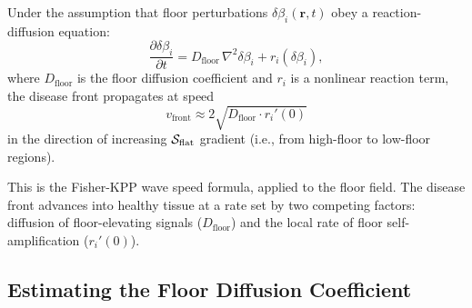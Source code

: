 \begin{proposition}
\label{prop:ch02b-disease-front}
Under the assumption that floor perturbations $\delta\beta_i(\mathbf{r}, t)$
obey a reaction-diffusion equation:
\begin{equation}
  \frac{\partial \delta\beta_i}{\partial t}
  = D_{\mathrm{floor}}\, \nabla^2 \delta\beta_i + r_i(\delta\beta_i),
  \label{eq:ch02b-reaction-diffusion}
\end{equation}
where $D_{\mathrm{floor}}$ is the floor diffusion coefficient and $r_i$ is a
nonlinear reaction term, the disease front propagates at speed
\begin{equation}
  v_{\mathrm{front}} \approx 2\sqrt{D_{\mathrm{floor}} \cdot r_i'(0)}
  \label{eq:ch02b-front-speed}
\end{equation}
in the direction of increasing $\mathcal{S}_{\mathrm{flat}}$ gradient (i.e.,
from high-floor to low-floor regions).
\end{proposition}

This is the Fisher-KPP wave speed formula, applied to the floor field.  The
disease front advances into healthy tissue at a rate set by two competing
factors: diffusion of floor-elevating signals ($D_{\mathrm{floor}}$) and the
local rate of floor self-amplification ($r_i'(0)$).

\subsection{Estimating the Floor Diffusion Coefficient}

